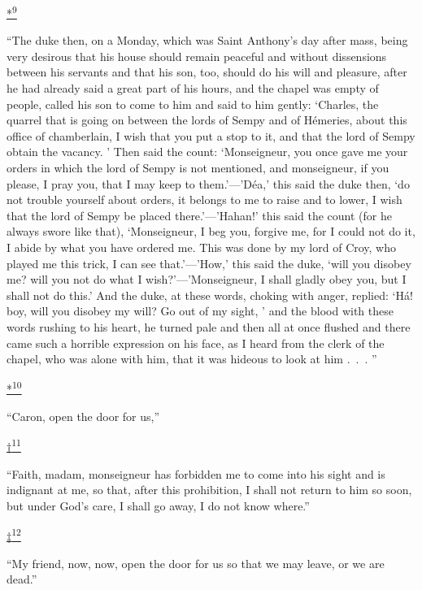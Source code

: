 \protect\hypertarget{23_NOTES.xhtmlux5cux23id_2364}{\protect\hyperlink{21_Chapter_Thirteen__IMAGE_AND_WORD.xhtmlux5cux23id_2363}{*\textsuperscript{9}}}
``The duke then, on a Monday, which was Saint Anthony's day after mass,
being very desirous that his house should remain peaceful and without
dissensions between his servants and that his son, too, should do his
will and pleasure, after he had already said a great part of his hours,
and the chapel was empty of people, called his son to come to him and
said to him gently: `Charles, the quarrel that is going on between the
lords of Sempy and of Hémeries, about this office of chamberlain, I wish
that you put a stop to it, and that the lord of Sempy obtain the
vacancy. ' Then said the count: `Monseigneur, you once gave me your
orders in which the lord of Sempy is not mentioned, and monseigneur, if
you please, I pray you, that I may keep to them.'---'Déa,' this said the
duke then, `do not trouble yourself about orders, it belongs to me to
raise and to lower, I wish that the lord of Sempy be placed
there.'---'Hahan!' this said the count (for he always swore like that),
`Monseigneur, I beg you, forgive me, for I could not do it, I abide by
what you have ordered me. This was done by my lord of Croy, who played
me this trick, I can see that.'---'How,' this said the duke, `will you
disobey me? will you not do what I wish?'---'Monseigneur, I shall gladly
obey you, but I shall not do this.' And the duke, at these words,
choking with anger, replied: `Há! boy, will you disobey my will? Go out
of my sight, ' and the blood with these words rushing to his heart, he
turned pale and then all at once flushed and there came such a horrible
expression on his face, as I heard from the clerk of the chapel, who was
alone with him, that it was hideous to look at him .~.~. ''

\protect\hypertarget{23_NOTES.xhtmlux5cux23id_2714}{\protect\hyperlink{21_Chapter_Thirteen__IMAGE_AND_WORD.xhtmlux5cux23id_2713}{*\textsuperscript{10}}}
``Caron, open the door for us,''

\protect\hypertarget{23_NOTES.xhtmlux5cux23id_2716}{\protect\hyperlink{21_Chapter_Thirteen__IMAGE_AND_WORD.xhtmlux5cux23id_2715}{†\textsuperscript{11}}}
``Faith, madam, monseigneur has forbidden me to come into his sight and
is indignant at me, so that, after this prohibition, I shall not return
to him so soon, but under God's care, I shall go away, I do not know
where.''

\protect\hypertarget{23_NOTES.xhtmlux5cux23id_2718}{\protect\hyperlink{21_Chapter_Thirteen__IMAGE_AND_WORD.xhtmlux5cux23id_2717}{‡\textsuperscript{12}}}
``My friend, now, now, open the door for us so that we may leave, or we
are dead.''

